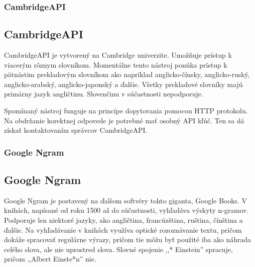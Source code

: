 {
	\subsubsection{CambridgeAPI}
}
{
	\subsection{CambridgeAPI}
}
\label{subsubsec:cambridgeapi}
CambridgeAPI je vytvorený na Cambridge univerzite. Umožňuje prístup k viacerým rôznym slovníkom. Momentálne tento nástroj ponúka prístup k pätnástim prekladovým slovníkom ako napríklad anglicko-čínsky, anglicko-ruský, anglicko-arabský, anglicko-japonský a ďalšie. Všetky prekladové slovníky majú primárny jazyk angličtinu. Slovenčinu v súčastnosti nepodporuje.

Spomínaný nástroj funguje na princípe dopytovania pomocou HTTP protokolu. Na obdržanie korektnej odpovede je potrebné mať osobný API kľúč. Ten sa dá získať kontaktovaním správcov CambridgeAPI.

{
	\subsubsection{Google Ngram}
}
{
	\subsection{Google Ngram}
}
\label{subsubsec:googlengram}
Google Ngram je postavený na ďalšom softvéry tohto giganta, Google Books. V knihách,  napísané od roku 1500 až do súčastnosti, vyhľadáva výskyty n-gramov. Podporuje len niektoré jazyky, ako angličtina, francúzština, ruština, čínština a ďalšie. Na vyhľadávanie v knihách využíva optické rozoznávanie textu, pričom dokáže spracovať regulárne výrazy, pričom tie môžu byť použité iba ako náhrada celého slova, ale nie uprostred slova. Slovné spojenie ,,* Einstein'' spracuje, pričom ,,Albert Einste*n'' nie.

